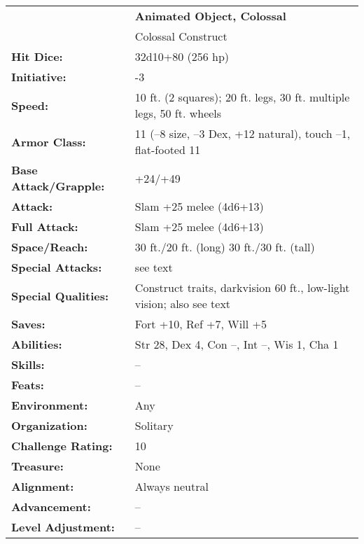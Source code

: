 \documentclass[../main.tex]{subfiles}
\begin{document}
\begin{table}[H]
  \centering
  \begin{tabular}{lp{16em}}
     & \textbf{Animated Object, Colossal} \\
     & Colossal Construct \\
    \rowcolor[HTML]{FFCE93}
    \textbf{Hit Dice:} & 32d10+80 (256 hp) \\
    \textbf{Initiative:} & -3 \\
    \rowcolor[HTML]{FFCE93}
    \textbf{Speed:} & 10 ft. (2 squares); 20 ft. legs, 30 ft. multiple legs, 50 ft. wheels \\
    \textbf{Armor Class:} & 11 (–8 size, –3 Dex, +12 natural), touch –1, flat-footed 11 \\
    \rowcolor[HTML]{FFCE93}
    \textbf{Base Attack/Grapple:} & +24/+49 \\
    \textbf{Attack:} & Slam +25 melee (4d6+13) \\
    \rowcolor[HTML]{FFCE93}
    \textbf{Full Attack:} & Slam +25 melee (4d6+13) \\
    \textbf{Space/Reach:} & 30 ft./20 ft. (long) 30 ft./30 ft. (tall) \\
    \rowcolor[HTML]{FFCE93}
    \textbf{Special Attacks:} & see text \\
    \textbf{Special Qualities:} & Construct traits, darkvision 60 ft., low-light vision; also see text \\
    \rowcolor[HTML]{FFCE93}
    \textbf{Saves:} & Fort +10, Ref +7, Will +5 \\
    \textbf{Abilities:} & Str 28, Dex 4, Con --, Int --, Wis 1, Cha 1 \\
    \rowcolor[HTML]{FFCE93}
    \textbf{Skills:} & -- \\
    \textbf{Feats:} & -- \\
    \rowcolor[HTML]{FFCE93}
    \textbf{Environment:} & Any \\
    \textbf{Organization:} & Solitary \\
    \rowcolor[HTML]{FFCE93}
    \textbf{Challenge Rating:} & 10 \\
    \textbf{Treasure:} & None \\
    \rowcolor[HTML]{FFCE93}
    \textbf{Alignment:} & Always neutral \\
    \textbf{Advancement:} & -- \\
    \rowcolor[HTML]{FFCE93}
    \textbf{Level Adjustment:} & -- \\
  \end{tabular}
\end{table}
\end{document}
